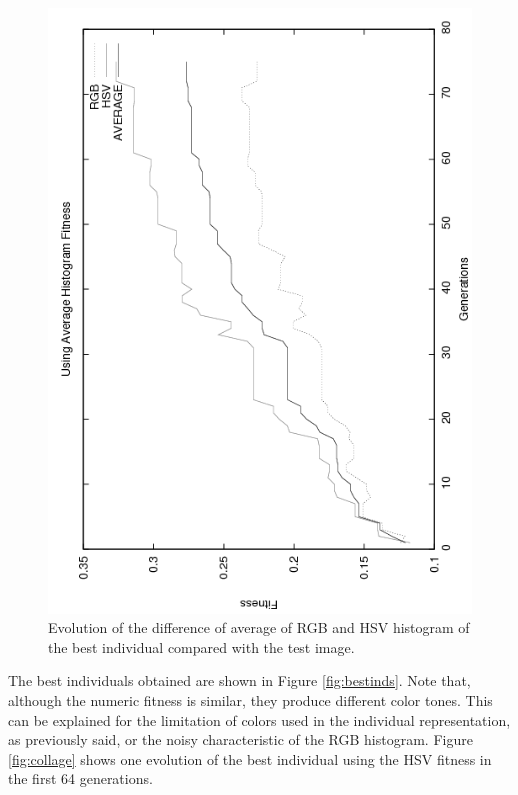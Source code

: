\begin{figure}
   \includegraphics[angle=-90,scale =0.40] {gfx/art/averagegens.png}
\caption{Evolution of the difference of average of RGB and HSV histogram of the best individual compared with the test image. }
\label{fig:averagegens}
\end{figure}

The best individuals obtained are shown in Figure
\ref{fig:bestinds}. Note that, although the numeric fitness is
similar, they produce different color tones. This can be explained for
the limitation of colors used in the individual representation, as
previously said, or the noisy characteristic of the RGB
histogram. Figure \ref{fig:collage} shows one evolution of the best
individual using the HSV fitness in the first 64 generations. %

